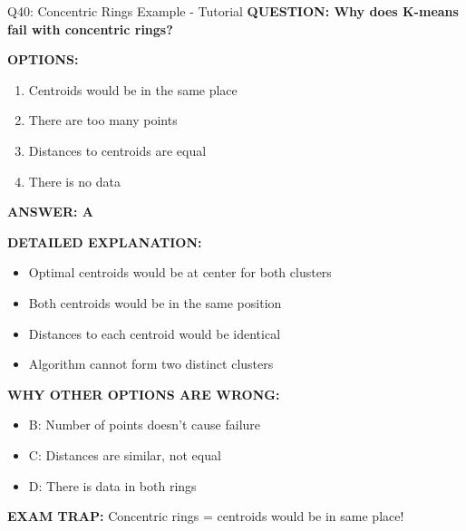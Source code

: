 \documentclass[8pt]{beamer}
\begin{document}
	\begin{frame}{Q40: Concentric Rings Example - Tutorial}
		\fontsize{6.5}{7.5}\selectfont
		\textbf{QUESTION: Why does K-means fail with concentric rings?}
		
		\vspace{0.1cm}
		\textbf{OPTIONS:}
		\begin{enumerate}
			\item Centroids would be in the same place
			\item There are too many points
			\item Distances to centroids are equal
			\item There is no data
		\end{enumerate}
		
		\vspace{0.1cm}
		\textcolor{myblue}{\textbf{ANSWER: A}}
		
		\vspace{0.1cm}
		\textbf{DETAILED EXPLANATION:}
		\begin{itemize}
			\item Optimal centroids would be at center for both clusters
			\item Both centroids would be in the same position
			\item Distances to each centroid would be identical
			\item Algorithm cannot form two distinct clusters
		\end{itemize}
		
		\vspace{0.1cm}
		\textcolor{myred}{\textbf{WHY OTHER OPTIONS ARE WRONG:}}
		\begin{itemize}
			\item \textcolor{myred}{B:} Number of points doesn't cause failure
			\item \textcolor{myred}{C:} Distances are similar, not equal
			\item \textcolor{myred}{D:} There is data in both rings
		\end{itemize}
		
		\textcolor{myred}{\textbf{EXAM TRAP:}} Concentric rings = \textcolor{myblue}{centroids would be in same place}!
	\end{frame}
	
\end{document}
